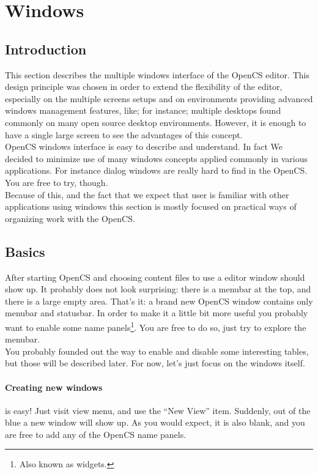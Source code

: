 \section{Windows}
\subsection{Introduction}
This section describes the multiple windows interface of the OpenCS editor. This design principle was chosen in order to extend the flexibility of the editor, especially on the multiple screens setups and on environments providing advanced windows management features, like; for instance; multiple desktops found commonly on many open source desktop environments. However, it is enough to have a single large screen to see the advantages of this concept.\\
OpenCS windows interface is easy to describe and understand. In fact We decided to minimize use of many windows concepts applied commonly in various applications. For instance dialog windows are really hard to find in the OpenCS. You are free to try, though.\\
Because of this, and the fact that we expect that user is familiar with other applications using windows this section is mostly focused on practical ways of organizing work with the OpenCS.

\subsection{Basics}
After starting Open{CS} and choosing content files to use a editor window should show up. It probably does not look surprising: there is a menubar at the top, and there is a large empty area. That's it: a brand new Open{CS} window contains only menubar and statusbar. In order to make it a little bit more useful you probably want to enable some name panels\footnote{Also known as widgets.}. You are free to do so, just try to explore the menubar. \\
You probably founded out the way to enable and disable some interesting tables, but those will be described later. For now, let's just focus on the windows itself.

\paragraph{Creating new windows}
is easy! Just visit view menu, and use the ``New View'' item. Suddenly, out of the blue a new window will show up. As you would expect, it is also blank, and you are free to add any of the Open{CS} name panels.

